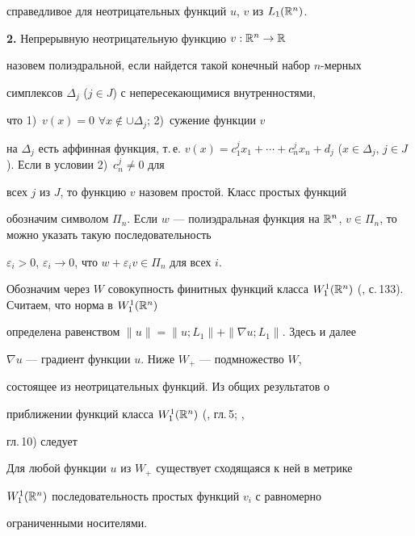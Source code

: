 справедливое для неотрицательных функций $u$, $v$ из $L_1(\Bbb R^n)$. 


\medskip 


 


{\bf 2.} Непрерывную неотрицательную функцию $v:\Bbb R^n\to\Bbb R$ 


назовем полиэдральной, если найдется такой конечный набор $n$-мерных 


симплексов $\Delta_j$ ($j\in J$) с непересекающимися внутренностями, 


что 1)~$v(x)=0$ $\forall x\notin\cup\Delta_j$; 2)~сужение функции $v$ 


на $\Delta_j$ есть аффинная функция, т.\,е. $v(x)=c^j_1x_1+\dotsb+c^j_n 


x_n+d_j$ ($x\in\Delta_j$, $j\in J$). Если в условии 2)~$c^j_n\ne 0$ для 


всех $j$ из $J$, то функцию $v$ назовем простой. Класс простых функций 


обозначим символом $\Pi_n$. Если $w$ --- полиэдральная функция на $\Bbb 


R^n$, $v\in\Pi_n$, то можно указать такую последовательность 


$\varepsilon_i>0$, $\varepsilon_i\to 0$, что $w+\varepsilon_i 


v\in\Pi_n$ для всех $i$. 


 


Обозначим через $W$ совокупность финитных функций класса $W^1_1(\Bbb 


R^n)$ (\cite{5}, с.\,133). Считаем, что норма в $W^1_1(\Bbb R^n)$ 


определена равенством $\|u\|=\|u;L_1\|+\|\nabla u;L_1\|$. Здесь и далее 


$\nabla u$ --- градиент функции $u$. Ниже $W_+$ --- подмножество $W$, 


состоящее из неотрицательных функций. Из общих результатов о 


приближении функций класса $W^1_1(\Bbb R^n)$ (\cite{5}, гл.\,5; \cite{8}, 


гл.\,10) следует 


 


\begin{prop} 


Для любой функции $u$ из $W_+$ существует сходящаяся к ней в метрике 


$W^1_1(\Bbb R^n)$ последовательность простых функций $v_i$ с равномерно 


ограниченными носителями. 


\end{prop} 


